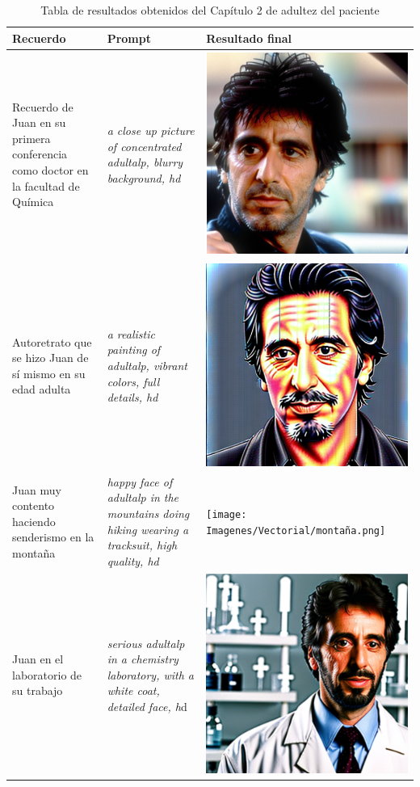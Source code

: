  \begin{table}
	\centering
	\begin{tabular}{>{\centering\arraybackslash}m{5cm} >{\arraybackslash}m{5cm}>{\arraybackslash}m{5cm}}
		\textbf{Recuerdo} & \textbf{Prompt} & \textbf{Resultado final} \\
		\hline
		Recuerdo de Juan en su primera conferencia como doctor en la facultad de Química & \textit{a close up picture of concentrated adultalp, blurry background, hd} & \includegraphics[width = 0.3
		\textwidth]{Imagenes/Vectorial/padultalp.png}\\
		\hline
		Autoretrato que se hizo Juan de sí mismo en su edad adulta & \textit{a realistic painting of adultalp, vibrant colors, full details, hd} & \includegraphics[width = 0.3
		\textwidth]{Imagenes/Vectorial/autorretrato2.png}\\
		\hline
		Juan muy contento haciendo senderismo en la montaña & \textit{happy face of adultalp in the mountains doing hiking wearing a tracksuit, high quality, hd} & \texttt{[image: Imagenes/Vectorial/montaña.png]}\\
		\hline
		Juan en el laboratorio de su trabajo & \textit{serious adultalp in a chemistry laboratory, with a white coat, detailed face, h}d & \includegraphics[width = 0.3
		\textwidth]{Imagenes/Vectorial/alplab.png}\\
		\hline
	\end{tabular}
	\caption{Tabla de resultados obtenidos del Capítulo 2 de adultez del paciente}
	\label{tab:capitulo2librovida}
\end{table}
 
